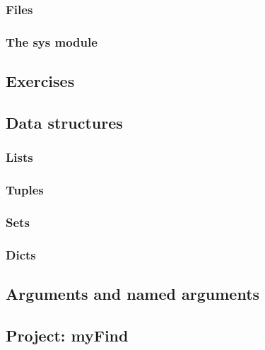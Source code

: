 \subsubsection{Files}
\subsubsection{The sys module}

\subsection{Exercises}

\subsection{Data structures}
\subsubsection{Lists}
\subsubsection{Tuples}
\subsubsection{Sets}
\subsubsection{Dicts}

\subsection{Arguments and named arguments}

\subsection{Project: myFind}
